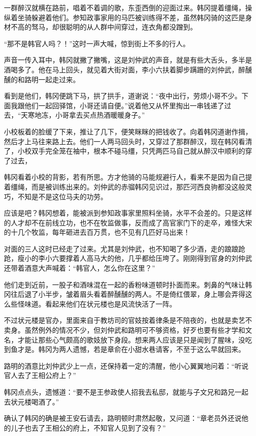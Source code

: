 一群醉汉就横在路前，唱着不着调的歌，东歪西倒的迎面过来。韩冈提着缰绳，操纵着坐骑躲避着他们。参知政事家用的马匹被训练得不差，虽然韩冈骑的这匹是身材不高的驽马，却很聪明的从人群中间穿过，连衣角都没蹭到。

“那不是韩官人吗？！”这时一声大喊，惊到街上不多的行人。

声音一传入耳中，韩冈就撇了撇嘴，这是刘仲武的声音，就是有些大舌头，多半是酒喝多了。他在马上回头，就见着大街对面，李小六扶着脚步蹒跚的刘仲武，醉醺醺的和路明一起走过来。

看到是他们，韩冈便跳下马，拱了拱手，道谢说：“夜中出行，劳烦小哥不少。下面我跟他们一起回驿馆，小哥还请自便。”说着他又从怀里掏出一串钱递了过去，“天寒地冻，小哥拿去买点热酒暖暖身子。”

小校板着的脸缓了下来，推让了几下，便笑眯眯的把钱收了。向着韩冈道谢作揖，然后才上马往来路上去。他们一人两马回头时，又穿过了那群醉汉，现在韩冈看清了，小校双手完全笼在袖中，根本不碰马缰，只凭两匹马自己就从醉汉中顺利的穿了过去，

韩冈看着小校的背影，若有所思。方才他骑的马能规避行人，看来不是因为自己提着缰绳，而是被训练出来的。刘仲武的赤骝韩冈见识过，那匹河西良驹都没这般灵巧，不知是不是这位马夫的功劳。

应该是吧？韩冈想着，能被派到参知政事家里照料坐骑，水平不会差的。只是这样的人才却不在前线立功，也不在牧监做事，反而成了高官家门下的走卒，难怪大宋的十几个牧监，每年砸进去百万贯，也不见有几匹好马出来！

对面的三人这时已经走了过来。尤其是刘仲武，也不知喝了多少酒，走的踉踉跄跄，瘦小的李小六要撑着人高马大的他，几乎都给压垮了。刚刚得到官身的刘仲武还带着酒意大声喊着：“韩官人，怎么你在这里？”

他们走到近前，一股子和酒味混在一起的香粉味道顿时扑面而来。刺鼻的气味让韩冈往后退了小半步，皱着眉头看着醉醺醺的两人。不是倚红偎翠，身上哪会弄得这么些怪味道。看起来他们在状元楼也是风流快活了一阵。

不过状元楼是官办，里面来自于教坊司的官妓按着律条是不陪夜的，也就是卖艺不卖身。虽然例外的情况不少，但刘仲武和路明可不够资格，好歹也要有些才学和文名，才能让那些心气颇高的歌妓放下身段。想来两人应该是只是闻到了腥味，没吃到鱼才是。韩冈为两人遗憾，若是章俞在小甜水巷请客，不至于这么早就回来。

路明的酒意比刘仲武少上一点，还保持着一定的清醒，他小心翼翼地问着：“听说官人去了王相公府上？”

韩冈点点头，遗憾道：“要不是王参政使人招我去私邸，就能与子文兄和路兄一起去状元楼喝酒了。”

确认了韩冈的确是被王安石请去，路明顿时肃然起敬，又问道：“章老员外还说他的儿子也去了王相公的府上，不知官人见到了没有？”

